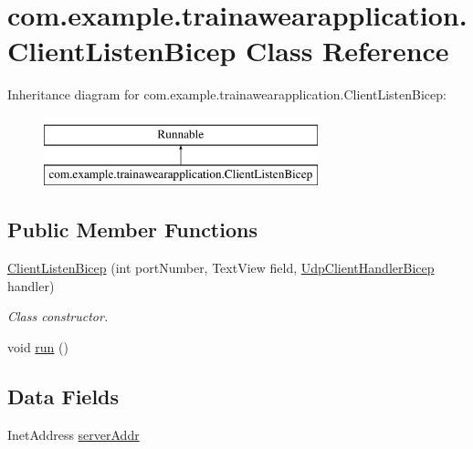 \hypertarget{classcom_1_1example_1_1trainawearapplication_1_1_client_listen_bicep}{}\section{com.\+example.\+trainawearapplication.\+Client\+Listen\+Bicep Class Reference}
\label{classcom_1_1example_1_1trainawearapplication_1_1_client_listen_bicep}
Inheritance diagram for com.\+example.\+trainawearapplication.\+Client\+Listen\+Bicep\+:\begin{figure}[H]
\begin{center}
\leavevmode
\includegraphics[height=2.000000cm]{classcom_1_1example_1_1trainawearapplication_1_1_client_listen_bicep}
\end{center}
\end{figure}
\subsection*{Public Member Functions}
\begin{DoxyCompactItemize}
\item 
\mbox{\hyperlink{classcom_1_1example_1_1trainawearapplication_1_1_client_listen_bicep_a7a29935d4f0dd55a5dd0c0f5f93eba8c}{Client\+Listen\+Bicep}} (int port\+Number, Text\+View field, \mbox{\hyperlink{classcom_1_1example_1_1trainawearapplication_1_1_udp_client_handler_bicep}{Udp\+Client\+Handler\+Bicep}} handler)
\begin{DoxyCompactList}\small\item\em Class constructor. \end{DoxyCompactList}\item 
void \mbox{\hyperlink{classcom_1_1example_1_1trainawearapplication_1_1_client_listen_bicep_a00c62e73027050af19a527f480a9be15}{run}} ()
\end{DoxyCompactItemize}
\subsection*{Data Fields}
\begin{DoxyCompactItemize}
\item 
Inet\+Address \mbox{\hyperlink{classcom_1_1example_1_1trainawearapplication_1_1_client_listen_bicep_a02882f0c88f5713407dbf2630e1909ff}{server\+Addr}}
\end{DoxyCompactItemize}
